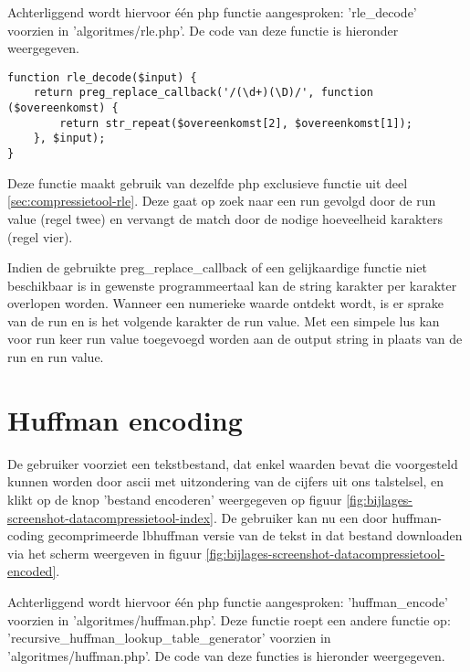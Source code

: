 Achterliggend wordt hiervoor één \gls{php} functie aangesproken: 'rle\_decode' voorzien in 'algoritmes/rle.php'. De code van deze functie is hieronder weergegeven.

\begin{lstlisting}
function rle_decode($input) {
	return preg_replace_callback('/(\d+)(\D)/', function ($overeenkomst) {
		return str_repeat($overeenkomst[2], $overeenkomst[1]);
	}, $input);
}
\end{lstlisting}

Deze functie maakt gebruik van dezelfde \gls{php} exclusieve functie uit deel \ref{sec:compressietool-rle}. Deze gaat op zoek naar een run gevolgd door de run value (regel twee) en vervangt de match door de nodige hoeveelheid karakters (regel vier).

Indien de gebruikte preg\_replace\_callback of een gelijkaardige functie niet beschikbaar is in gewenste programmeertaal kan de \gls{string} karakter per karakter overlopen worden. Wanneer een numerieke waarde ontdekt wordt, is er sprake van de run en is het volgende karakter de run value. Met een simpele lus kan voor run keer run value toegevoegd worden aan de output string in plaats van de run en run value.

\section{Huffman encoding}
\label{sec:compressietool-huffman-encoding}

De gebruiker voorziet een tekstbestand, dat enkel waarden bevat die voorgesteld kunnen worden door \gls{ascii} met uitzondering van de cijfers uit ons talstelsel, en klikt op de knop 'bestand encoderen' weergegeven op figuur \ref{fig:bijlages-screenshot-datacompressietool-index}. De gebruiker kan nu een door \gls{huffman-coding} gecomprimeerde \gls{lbhuffman} versie van de tekst in dat bestand downloaden via het scherm weergeven in figuur \ref{fig:bijlages-screenshot-datacompressietool-encoded}.

Achterliggend wordt hiervoor één \gls{php} functie aangesproken: 'huffman\_encode' voorzien in 'algoritmes/huffman.php'. Deze functie roept een andere functie op: 'recursive\_huffman\_lookup\_table\_generator' voorzien in 'algoritmes/huffman.php'.  De code van deze functies is hieronder weergegeven.

